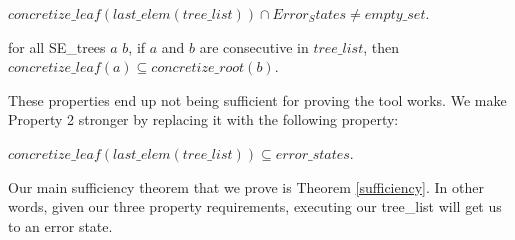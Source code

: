 \begin{property}
  \label{prop:enderror}
$ concretize\_leaf (last\_elem (tree\_list)) \cap Error_States 
\neq empty\_set $.
\end{property}

\begin{property}
  \label{prop:stitch}
for all SE\_trees $a$ $b$, 
if $a$ and $b$ are consecutive in $tree\_list$, then 
$concretize\_leaf (a) \subseteq
concretize\_root(b) $.
\end{property}

These properties end up not being sufficient for proving the tool works. 
We make Property 2 stronger by replacing it with the following property:

\setcounter{property}{1}
\renewcommand{\theproperty}{Z.\arabic{property}'}
\begin{property}
  \label{prop:correctedz2}
$concretize\_leaf (last\_elem (tree\_list))
\subseteq error\_states $.
\end{property}



Our main sufficiency theorem that we prove is Theorem \ref{sufficiency}. In other words, given our three property requirements, executing our tree\_list will get us to an error state.
